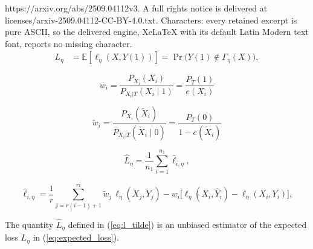 \documentclass[10pt,a4paper]{amsart}
\begin{document}
https://arxiv.org/abs/2509.04112v3. A full rights notice is delivered at licenses/arxiv-2509.04112-CC-BY-4.0.txt. Characters: every retained excerpt is pure ASCII, so the delivered engine, XeLaTeX with its default Latin Modern text font, reports no missing character.
\begin{equation}
\label{eq:expected_loss}
\begin{split}
L_\eta
&= \mathbb{E}\!\left[\ell_\eta(X, Y(1))\right]
= \Pr\!\big( Y(1) \notin \Gamma_\eta(X) \big),
\end{split}
\end{equation}

\begin{equation}
\label{eq:new_weights}
w_i = \frac{P_{X_i}( X_i)}{P_{X_i|T}(X_i \mid 1)} = \frac{P_T( 1)}{e(X_i)}
\end{equation}

\begin{equation}
\label{eq:new_weights_2}
\tilde{w}_i = \frac{P_{X_i}( \tilde{X}_i)}{P_{X_i|T}(\tilde{X}_i \mid 0)} = \frac{P_T( 0)}{1-e(\tilde{X}_i)}
\end{equation}

\begin{equation}
\label{eq:l_tilde}
    \hat{L}_\eta = \frac{1}{n_1} \sum_{i=1}^{n_1} \hat{\ell}_{i,\eta},
\end{equation}

\begin{equation}
\label{eq:debiased_loss_eta}
\hat{\ell}_{i,\eta}
= \frac{1}{r} \sum_{j = r(i-1)+1}^{ri}
    \tilde{w}_j \,\ell_\eta(\tilde{X}_j, \tilde{Y}_j) - w_i \Big[ \ell_\eta(X_i, \hat{Y}_i) - \ell_\eta(X_i, Y_i) \Big],
\end{equation}

\begin{proposition}
    The quantity \( \hat{L}_\eta \) defined in (\ref{eq:l_tilde}) is an unbiased estimator of the expected loss \( L_\eta \) in (\ref{eq:expected_loss}).
\end{proposition}
\end{document}
